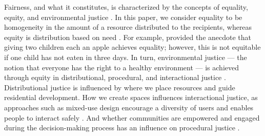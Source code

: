 \documentclass[final,3p,times,onecolumn,sort&compress]{elsarticle}
\begin{document}
Fairness, and what it constitutes, is characterized by the concepts of equality, equity, and environmental justice \citep{Talen1998-mk, Low2013-yx, Rigolon2019-zr, Lopez2011-cc}.
In this paper, we consider equality to be homogeneity in the amount of a resource distributed to the recipients, whereas equity is distribution based on need \citep{Talen1998-mk, Lucy1981-xr}.
For example, \cite{Rumley2014-pu} provided the anecdote that giving two children each an apple achieves equality; however, this is not equitable if one child has not eaten in three days. 
In turn, environmental justice --- the notion that everyone has the right to a healthy environment \citep{Lopez2011-cc} --- is achieved through equity in distributional, procedural, and interactional justice \cite{Low2013-yx}.
Distributional justice is influenced by where we place resources and guide residential development.
How we create spaces influences interactional justice, as approaches such as mixed-use design encourage a diversity of users and enables people to interact safely \citep{Jacobs1961-po}.
And whether communities are empowered and engaged during the decision-making process has an influence on procedural justice \citep{Low2013-yx, Rigolon2019-zr}.
\end{document}
